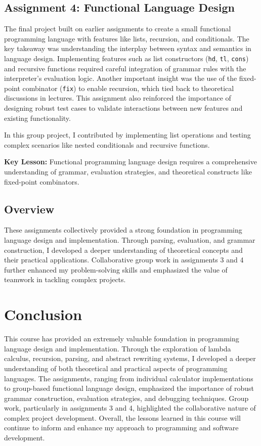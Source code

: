 \documentclass{article}
\theoremstyle{theorem}
\theoremstyle{definition}
\theoremstyle{remark}
\begin{document}
\subsection{Assignment 4: Functional Language Design}
The final project built on earlier assignments to create a small functional programming language with features like lists, recursion, and conditionals. The key takeaway was understanding the interplay between syntax and semantics in language design. Implementing features such as list constructors (\texttt{hd}, \texttt{tl}, \texttt{cons}) and recursive functions required careful integration of grammar rules with the interpreter's evaluation logic. Another important insight was the use of the fixed-point combinator (\texttt{fix}) to enable recursion, which tied back to theoretical discussions in lectures. This assignment also reinforced the importance of designing robust test cases to validate interactions between new features and existing functionality.

In this group project, I contributed by implementing list operations and testing complex scenarios like nested conditionals and recursive functions.

\textbf{Key Lesson:} Functional programming language design requires a comprehensive understanding of grammar, evaluation strategies, and theoretical constructs like fixed-point combinators.

\subsection{Overview}
These assignments collectively provided a strong foundation in programming language design and implementation. Through parsing, evaluation, and grammar construction, I developed a deeper understanding of theoretical concepts and their practical applications. Collaborative group work in assignments 3 and 4 further enhanced my problem-solving skills and emphasized the value of teamwork in tackling complex projects.



\section{Conclusion}\label{conclusion}

This course has provided an extremely valuable foundation in programming language design and implementation. Through the exploration of lambda calculus, recursion, parsing, and abstract rewriting systems, I developed a deeper understanding of both theoretical and practical aspects of programming languages. The assignments, ranging from individual calculator implementations to group-based functional language design, emphasized the importance of robust grammar construction, evaluation strategies, and debugging techniques. Group work, particularly in assignments 3 and 4, highlighted the collaborative nature of complex project development. Overall, the lessons learned in this course will continue to inform and enhance my approach to programming and software development.
\end{document}
